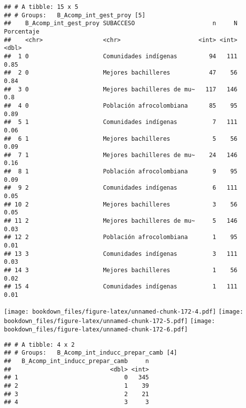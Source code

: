 \documentclass[]{article}
\theoremstyle{definition}
\theoremstyle{definition}
\theoremstyle{definition}
\theoremstyle{remark}
\begin{document}
\begin{verbatim}
## # A tibble: 15 x 5
## # Groups:   B_Acomp_int_gest_proy [5]
##    B_Acomp_int_gest_proy SUBACCESO                      n     N Porcentaje
##    <chr>                 <chr>                      <int> <int>      <dbl>
##  1 0                     Comunidades indígenas         94   111       0.85
##  2 0                     Mejores bachilleres           47    56       0.84
##  3 0                     Mejores bachilleres de mu~   117   146       0.8 
##  4 0                     Población afrocolombiana      85    95       0.89
##  5 1                     Comunidades indígenas          7   111       0.06
##  6 1                     Mejores bachilleres            5    56       0.09
##  7 1                     Mejores bachilleres de mu~    24   146       0.16
##  8 1                     Población afrocolombiana       9    95       0.09
##  9 2                     Comunidades indígenas          6   111       0.05
## 10 2                     Mejores bachilleres            3    56       0.05
## 11 2                     Mejores bachilleres de mu~     5   146       0.03
## 12 2                     Población afrocolombiana       1    95       0.01
## 13 3                     Comunidades indígenas          3   111       0.03
## 14 3                     Mejores bachilleres            1    56       0.02
## 15 4                     Comunidades indígenas          1   111       0.01
\end{verbatim}

\texttt{[image: bookdown\_files/figure-latex/unnamed-chunk-172-4.pdf]}
\texttt{[image: bookdown\_files/figure-latex/unnamed-chunk-172-5.pdf]}
\texttt{[image: bookdown\_files/figure-latex/unnamed-chunk-172-6.pdf]}

\begin{verbatim}
## # A tibble: 4 x 2
## # Groups:   B_Acomp_int_inducc_prepar_camb [4]
##   B_Acomp_int_inducc_prepar_camb     n
##                            <dbl> <int>
## 1                              0   345
## 2                              1    39
## 3                              2    21
## 4                              3     3
\end{verbatim}
\end{document}
